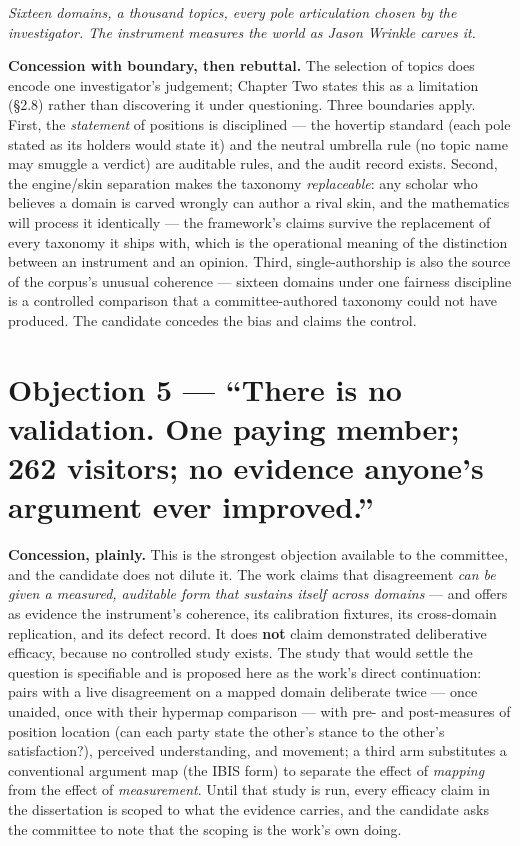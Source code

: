 \emph{Sixteen domains, a thousand topics, every pole articulation chosen
by the investigator. The instrument measures the world as Jason Wrinkle
carves it.}

\textbf{Concession with boundary, then rebuttal.} The selection of
topics does encode one investigator's judgement; Chapter Two states this
as a limitation (\S 2.8) rather than discovering it under questioning.
Three boundaries apply. First, the \emph{statement} of positions is
disciplined --- the hovertip standard (each pole stated as its holders
would state it) and the neutral umbrella rule (no topic name may smuggle
a verdict) are auditable rules, and the audit record exists. Second, the
engine/skin separation makes the taxonomy \emph{replaceable}: any
scholar who believes a domain is carved wrongly can author a rival skin,
and the mathematics will process it identically --- the framework's
claims survive the replacement of every taxonomy it ships with, which is
the operational meaning of the distinction between an instrument and an
opinion. Third, single-authorship is also the source of the corpus's
unusual coherence --- sixteen domains under one fairness discipline is a
controlled comparison that a committee-authored taxonomy could not have
produced. The candidate concedes the bias and claims the control.

\section{Objection 5 --- ``There is no validation. One paying member;
262 visitors; no evidence anyone's argument ever
improved.''}\label{objection-5-there-is-no-validation.-one-paying-member-262-visitors-no-evidence-anyones-argument-ever-improved.}

\textbf{Concession, plainly.} This is the strongest objection available
to the committee, and the candidate does not dilute it. The work claims
that disagreement \emph{can be given a measured, auditable form that
sustains itself across domains} --- and offers as evidence the
instrument's coherence, its calibration fixtures, its cross-domain
replication, and its defect record. It does \textbf{not} claim
demonstrated deliberative efficacy, because no controlled study exists.
The study that would settle the question is specifiable and is proposed
here as the work's direct continuation: pairs with a live disagreement
on a mapped domain deliberate twice --- once unaided, once with their
hypermap comparison --- with pre- and post-measures of position location
(can each party state the other's stance to the other's satisfaction?),
perceived understanding, and movement; a third arm substitutes a
conventional argument map (the IBIS form) to separate the effect of
\emph{mapping} from the effect of \emph{measurement}. Until that study
is run, every efficacy claim in the dissertation is scoped to what the
evidence carries, and the candidate asks the committee to note that the
scoping is the work's own doing.

